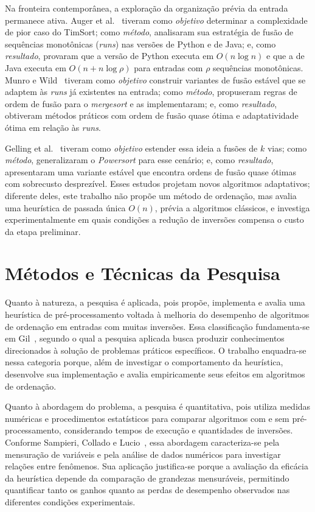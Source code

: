 \documentclass[12pt]{article}
\begin{document}
Na fronteira contemporânea, a exploração da organização prévia da entrada permanece ativa. Auger et al.~\cite{auger_timsort_2018} tiveram como \emph{objetivo} determinar a complexidade de pior caso do TimSort; como \emph{método}, analisaram sua estratégia de fusão de sequências monotônicas (\emph{runs}) nas versões de Python e de Java; e, como \emph{resultado}, provaram que a versão de Python executa em $O(n \log n)$ e que a de Java executa em $O(n + n \log \rho)$ para entradas com $\rho$ sequências monotônicas. Munro e Wild~\cite{munro_powersort_2018} tiveram como \emph{objetivo} construir variantes de fusão estável que se adaptem às \emph{runs} já existentes na entrada; como \emph{método}, propuseram regras de ordem de fusão para o \emph{mergesort} e as implementaram; e, como \emph{resultado}, obtiveram métodos práticos com ordem de fusão quase ótima e adaptatividade ótima em relação às \emph{runs}.

Gelling et al.~\cite{gelling_multiway_2023} tiveram como \emph{objetivo} estender essa ideia a fusões de $k$ vias; como \emph{método}, generalizaram o \emph{Powersort} para esse cenário; e, como \emph{resultado}, apresentaram uma variante estável que encontra ordens de fusão quase ótimas com sobrecusto desprezível. Esses estudos projetam novos algoritmos adaptativos; diferente deles, este trabalho não propõe um método de ordenação, mas avalia uma heurística de passada única $O(n)$, prévia a algoritmos clássicos, e investiga experimentalmente em quais condições a redução de inversões compensa o custo da etapa preliminar.

\section{Métodos e Técnicas da Pesquisa}\label{sec:met}

Quanto à natureza, a pesquisa é aplicada, pois propõe, implementa e avalia uma heurística de pré-processamento voltada à melhoria do desempenho de algoritmos de ordenação em entradas com muitas inversões. Essa classificação fundamenta-se em Gil~\cite{gil_metodos_2019}, segundo o qual a pesquisa aplicada busca produzir conhecimentos direcionados à solução de problemas práticos específicos. O trabalho enquadra-se nessa categoria porque, além de investigar o comportamento da heurística, desenvolve sua implementação e avalia empiricamente seus efeitos em algoritmos de ordenação.

Quanto à abordagem do problema, a pesquisa é quantitativa, pois utiliza medidas numéricas e procedimentos estatísticos para comparar algoritmos com e sem pré-processamento, considerando tempos de execução e quantidades de inversões. Conforme Sampieri, Collado e Lucio~\cite{sampieri_metodologia_2021}, essa abordagem caracteriza-se pela mensuração de variáveis e pela análise de dados numéricos para investigar relações entre fenômenos. Sua aplicação justifica-se porque a avaliação da eficácia da heurística depende da comparação de grandezas mensuráveis, permitindo quantificar tanto os ganhos quanto as perdas de desempenho observados nas diferentes condições experimentais.
\end{document}

